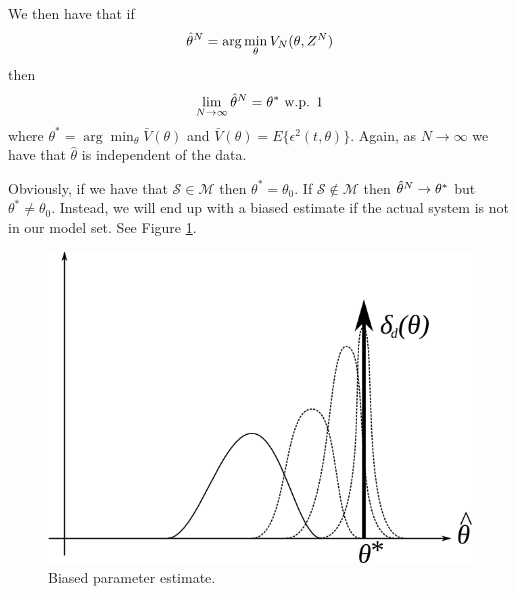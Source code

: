 We then have that if
$$\hat{\theta}^N = \arg\min_\theta V_N(\theta,Z^N)$$
then
$$\lim_{N\to\infty}\hat{\theta}^N = \theta^\ast \text{ w.p. } 1$$
where $\theta^\ast = \arg\min_\theta \bar{V}(\theta)$ and $\bar{V}(\theta) = E\{\epsilon^2(t,\theta)\}$. Again, as $N\to\infty$ we have that $\hat{\theta}$ is independent of the data.

Obviously, if we have that $\mathcal{S}\in\mathcal{M}$ then $\theta^\ast=\theta_0$. If $\mathcal{S}\notin\mathcal{M}$ then $\hat{\theta}^N\to\theta^\ast$ but $\theta^\ast\neq\theta_0$. Instead, we will end up with a biased estimate if the actual system is not in our model set. See Figure \ref{fig:13bias}.

\begin{figure}[ht!]
	\centering
	\includegraphics[width=.4\textwidth]{images/13bias}
	\caption{Biased parameter estimate.}
	\label{fig:13bias}
\end{figure}

